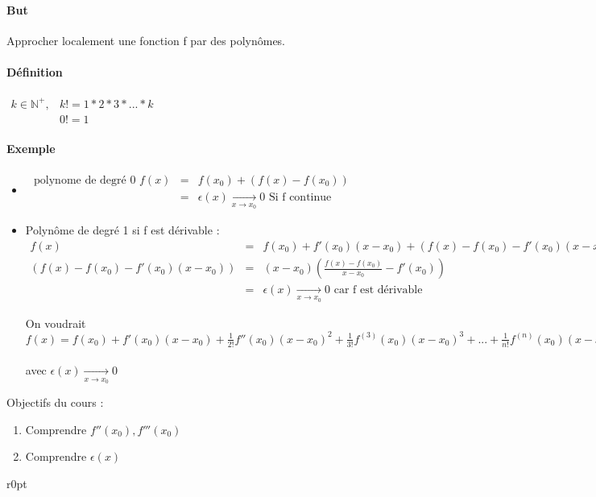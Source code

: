 \paragraph{But} Approcher localement une fonction f par des polynômes.
\paragraph{Définition} $\begin{array}{rl}
	k \in \mathbb{N}^+,& k!=1*2*3*...*k \\
						&0! = 1 \end{array}$
\paragraph{Exemple}
\begin{itemize}
	\item $\begin{array}{rcl}
			\text{ polynome de degré 0 } f(x) &=& f(x_0)+(f(x)-f(x_0)) \\
&=& \epsilon (x) \xrightarrow[x \to x_0]{} 0 \text { Si f continue}\end{array}$
		\item Polynôme de degré 1 si f est dérivable : ~\\
			$\begin{array}{rcl}
				f(x) &=& f(x_0) + f'(x_0)(x-x_0)+(f(x)-f(x_0)-f'(x_0)(x-x_0)) \\
						 (f(x)-f(x_0)-f'(x_0)(x-x_0)) &=& (x-x_0)(\frac{f(x)-f(x_0)}{x-x_0} - f'(x_0))\\
																																	&=& \epsilon (x) \xrightarrow[x \to x_0]{} 0 \text{ car f est dérivable}
			\end{array}$

On voudrait ~\\
	$f(x) = f(x_0)+f'(x_0)(x-x_0) + \frac{1}{2!}f''(x_0)(x-x_0)^2 + \frac{1}{3!}f^{(3)}(x_0)(x-x_0)^3 + ...+ \frac{1}{n!}f^{(n)}(x_0)(x-x_0)^n+(x-x_0)^n \epsilon(x)$ ~\\
avec $\epsilon (x) \xrightarrow[x\to x_0]{} 0$
\end{itemize}


Objectifs du cours : 
\begin{enumerate}
	\item Comprendre $f''(x_0), f'''(x_0)$
	\item Comprendre $\epsilon (x)$
\end{enumerate}

\newpage
\begin{wrapfigure}[7]{r}{0pt}
\end{wrapfigure}


